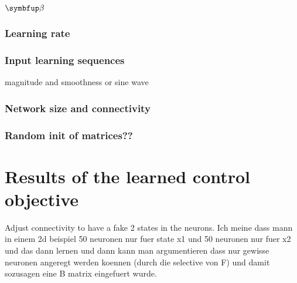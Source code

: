 \subsubsection{$\bmu{\beta}$}
\subsubsection{Learning rate}
\subsubsection{Input learning sequences}
magnitude and smoothness or sine wave
\subsubsection{Network size and connectivity}
\subsubsection{Random init of matrices??}





\section{Results of the learned control objective}
Adjust connectivity to have a fake 2 states in the neurons.
Ich meine dass mann in einem 2d beispiel 50 neuronen nur fuer state x1 und 50 neuronen nur fuer x2 und das dann lernen und dann kann man argumentieren dass nur gewisse neuronen angeregt werden koennen (durch die selective von F) und damit sozusagen eine B matrix eingefuert wurde.